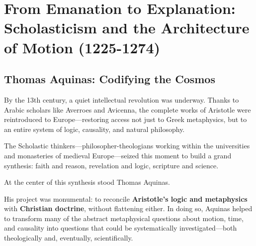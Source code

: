 \section{From Emanation to Explanation: Scholasticism and the Architecture of Motion (1225-1274)}

\subsection{Thomas Aquinas: Codifying the Cosmos}

By the 13th century, a quiet intellectual revolution was underway. Thanks to Arabic scholars like Averroes and Avicenna, the complete works of Aristotle were reintroduced to Europe—restoring access not just to Greek metaphysics, but to an entire system of logic, causality, and natural philosophy. 

The Scholastic thinkers—philosopher-theologians working within the universities and monasteries of medieval Europe—seized this moment to build a grand synthesis: faith and reason, revelation and logic, scripture and science.

At the center of this synthesis stood Thomas Aquinas.

His project was monumental: to reconcile \textbf{Aristotle’s logic and metaphysics} with \textbf{Christian doctrine}, without flattening either. In doing so, Aquinas helped to transform many of the abstract metaphysical questions about motion, time, and causality into questions that could be systematically investigated—both theologically and, eventually, scientifically.


